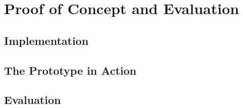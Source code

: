 \chapter{Proof of Concept and Evaluation}
\label{cap:evaluation}




\section{Implementation}
\label{sec:evaluation:implementation}













%     

%     

\section{The Prototype in Action} %


\section{Evaluation}
\label{sec:evaluation:evaluation}




